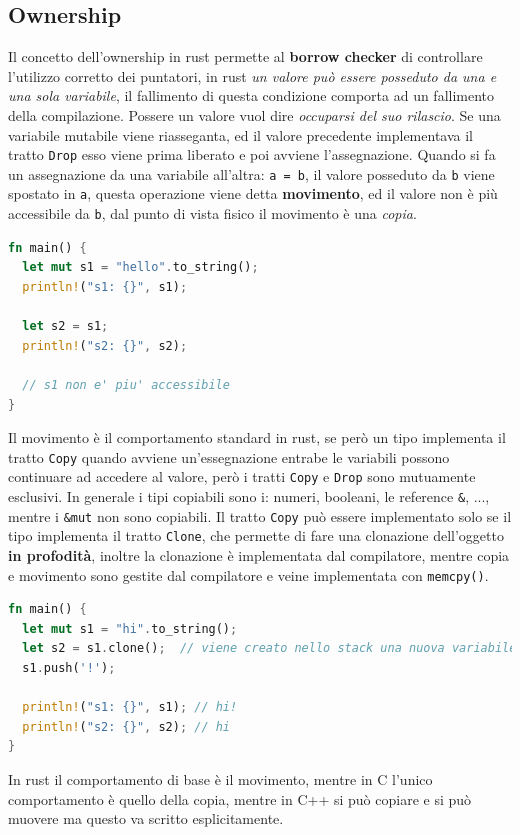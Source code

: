 \documentclass[12pt]{article}
\begin{document}
\subsection{Ownership}
Il concetto dell'ownership in rust permette al \textbf{borrow checker} di controllare l'utilizzo corretto dei puntatori, in rust \emph{un valore pu\`o essere posseduto da una e una sola variabile}, il fallimento di questa condizione comporta ad un fallimento della compilazione. Possere un valore vuol dire \emph{occuparsi del suo rilascio}. Se una variabile mutabile viene riasseganta, ed il valore precedente implementava il tratto \texttt{Drop} esso viene prima liberato e poi avviene l'assegnazione. Quando si fa un assegnazione da una variabile all'altra: \texttt{a = b}, il valore posseduto da \texttt{b} viene spostato in \texttt{a}, questa operazione viene detta \textbf{movimento}, ed il valore non \`e pi\`u accessibile da \texttt{b}, dal punto di vista fisico il movimento \`e una \emph{copia}.
\begin{lstlisting}[language=rust]
fn main() {
  let mut s1 = "hello".to_string();
  println!("s1: {}", s1);

  let s2 = s1;
  println!("s2: {}", s2);

  // s1 non e' piu' accessibile
}
\end{lstlisting}
Il movimento \`e il comportamento standard in rust, se per\`o un tipo implementa il tratto \texttt{Copy} quando avviene un'essegnazione entrabe le variabili possono continuare ad accedere al valore, per\`o i tratti \texttt{Copy} e \texttt{Drop} sono mutuamente esclusivi. In generale i tipi copiabili sono i: numeri, booleani, le reference \texttt{\&}, ..., mentre i \texttt{\&mut} non sono copiabili. Il tratto \texttt{Copy} pu\`o essere implementato solo se il tipo implementa il tratto \texttt{Clone}, che permette di fare una clonazione dell'oggetto \textbf{in profodit\`a}, inoltre la clonazione \`e implementata dal compilatore, mentre copia e movimento sono gestite dal compilatore e veine implementata con \texttt{memcpy()}.
\begin{lstlisting}[language=rust]
fn main() {
  let mut s1 = "hi".to_string();
  let s2 = s1.clone();  // viene creato nello stack una nuova variabile e nell'heap un nuovo valore
  s1.push('!');

  println!("s1: {}", s1); // hi!
  println!("s2: {}", s2); // hi
}
\end{lstlisting}
In rust il comportamento di base \`e il movimento, mentre in C l'unico comportamento \`e quello della copia, mentre in C++ si pu\`o copiare e si pu\`o muovere ma questo va scritto esplicitamente.
\end{document}

